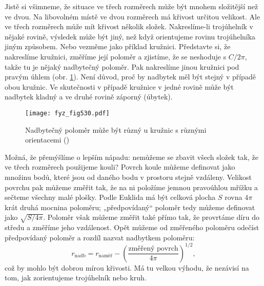     Jistě si všimneme, že situace ve třech rozměrech může být mnohem složitější než ve dvou. Na 
    libovolném místě ve dvou rozměrech má křivost určitou velikost. Ale ve třech rozměrech může mít 
    křivost několik složek. Nakreslíme-li trojúhelník v nějaké rovině, výsledek může být jiný, než 
    když orientujeme rovinu trojúhelníka jiným způsobem. Nebo vezměme jako příklad kružnici. 
    Představte si, že nakreslíme kružnici, změříme její poloměr a zjistíme, že se neshoduje s 
    \(C/2\pi\), takže tu je nějaký nadbytečný poloměr. Pak nakreslíme jinou kružnici pod pravým 
    úhlem (obr. \ref{fyz:fig530}). Není důvod, proč by nadbytek měl být stejný v případě obou 
    kružnic. Ve skutečnosti v případě kružnice v jedné rovině může být nadbytek kladný a ve druhé 
    rovině záporný (úbytek).
    
    \begin{figure}[ht!] %
      \centering
      \texttt{[image: fyz\_fig530.pdf]}
      \caption{Nadbytečný poloměr může být různý u kružnic s různými orientacemi      
               (\cite[s.~782]{Feynman02})}
      \label{fyz:fig530}
    \end{figure}
    
    Možná, že přemýšlíme o lepším nápadu: nemůžeme se zbavit všech složek tak, že ve třech 
    rozměrech použijeme kouli? Povrch koule můžeme definovat jako množinu bodů, které jsou od 
    daného bodu v prostoru stejně vzdáleny. Velikost povrchu pak můžeme změřit tak, že na ni 
    položíme jemnou pravoúhlou mřížku a sečteme všechny malé plošky. Podle Euklida má být celková 
    plocha \(S\) rovna \(4\pi\) krát druhá mocnina poloměru; „předpovídaný“ poloměr tedy můžeme 
    definovat jako \(\sqrt{S/4\pi}\). Poloměr však můžeme změřit také přímo tak, že provrtáme díru 
    do středu a změříme jeho vzdálenost. Opět můžeme od změřeného poloměru odečíst předpovídaný 
    poloměr a rozdíl nazvat nadbytkem poloměru:
    \begin{equation*}
      r_{\text{nadb}} = r_{\text{naměř}} -\left(\dfrac{\text{změřený povrch}}{4\pi}\right)^{1/2},
    \end{equation*}
    což by mohlo být dobrou mírou křivosti. Má tu velkou výhodu, že nezávisí na tom, jak 
    zorientujeme trojúhelník nebo kruh.
    
